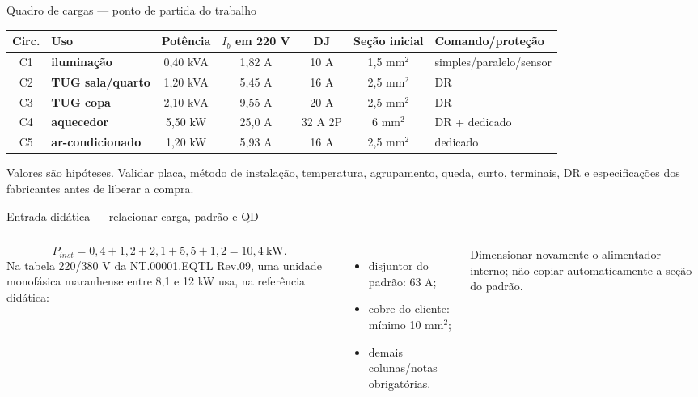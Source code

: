 \begin{frame}{Quadro de cargas — ponto de partida do trabalho}
\scriptsize
\begin{tabularx}{\textwidth}{c >{\bfseries}p{2.7cm}c c c c X}
\toprule
Circ. & Uso & Potência & $I_b$ em 220 V & DJ & Seção inicial & Comando/proteção \\
\midrule
C1 & iluminação & 0,40 kVA & 1,82 A & 10 A & 1,5 mm$^2$ & simples/paralelo/sensor \\
C2 & TUG sala/quarto & 1,20 kVA & 5,45 A & 16 A & 2,5 mm$^2$ & DR \\
C3 & TUG copa & 2,10 kVA & 9,55 A & 20 A & 2,5 mm$^2$ & DR \\
C4 & aquecedor & 5,50 kW & 25,0 A & 32 A 2P & 6 mm$^2$ & DR + dedicado \\
C5 & ar-condicionado & 1,20 kW & 5,93 A & 16 A & 2,5 mm$^2$ & dedicado \\
\bottomrule
\end{tabularx}
\begin{caixaAt}
Valores são hipóteses. Validar placa, método de instalação, temperatura, agrupamento, queda, curto, terminais, DR e especificações dos fabricantes antes de liberar a compra.
\end{caixaAt}
\end{frame}

\begin{frame}{Entrada didática — relacionar carga, padrão e QD}
\small
\begin{columns}[T,onlytextwidth]
\[
P_{inst}=0{,}4+1{,}2+2{,}1+5{,}5+1{,}2=10{,}4\ \mathrm{kW}.
\]
Na tabela 220/380 V da NT.00001.EQTL Rev.09, uma unidade monofásica maranhense entre 8,1 e 12 kW usa, na referência didática:
\begin{itemize}
\item disjuntor do padrão: 63 A;
\item cobre do cliente: mínimo 10 mm$^2$;
\item demais colunas/notas obrigatórias.
\end{itemize}
\begin{caixaAt}
Dimensionar novamente o alimentador interno; não copiar automaticamente a seção do padrão.
\end{caixaAt}
\end{columns}
\end{frame}

